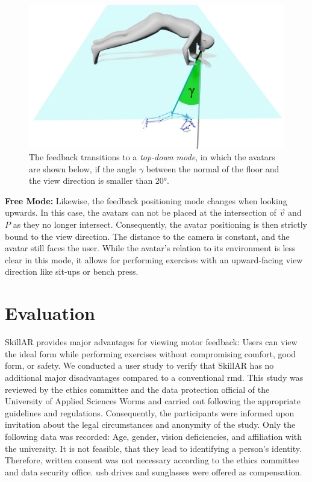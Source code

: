 \begin{figure}[h!]
	\centering
	\includegraphics[width=0.6\linewidth]{pictures/floorPos.png}
	\caption[Top-down mode visualizing exercises when looking down.]{The feedback transitions to a \emph{top-down mode}, in which the avatars are shown below, if the angle $\gamma$ between the normal of the floor and the view direction is smaller than 20°. \label{fig:floor}}
\end{figure}

\textbf{Free Mode:}
Likewise, the feedback positioning mode changes when looking upwards. In this case, the avatars can not be placed at the intersection of $\vec{v}$ and $P$ as they no longer intersect. Consequently, the avatar positioning is then strictly bound to the view direction. The distance to the camera is constant, and the avatar still faces the user. While the avatar's relation to its environment is less clear in this mode, it allows for performing exercises with an upward-facing view direction like sit-ups or bench press.

\section{Evaluation}
SkillAR provides major advantages for viewing motor feedback: Users can view the ideal form while performing exercises without compromising comfort, good form, or safety. We conducted a user study to verify that SkillAR has no additional major disadvantages compared to a conventional \acrshort{rmd}. This study was reviewed by the ethics committee and the data protection official of the University of Applied Sciences Worms and carried out following the appropriate guidelines and regulations. Consequently, the participants were informed upon invitation about the legal circumstances and anonymity of the study. Only the following data was recorded: Age, gender, vision deficiencies, and affiliation with the university. It is not feasible, that they lead to identifying a person's identity. Therefore, written consent was not necessary according to the ethics committee and data security office. \acrshort{usb} drives and sunglasses were offered as compensation.

